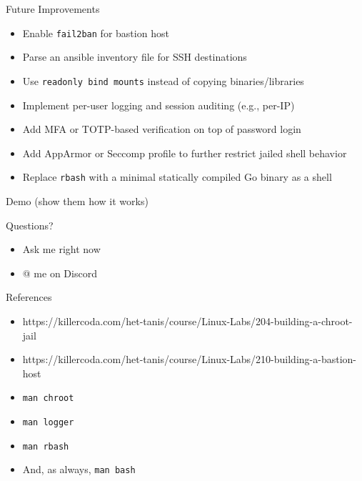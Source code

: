 \documentclass[14pt,compress,dvipsnames,aspectratio=169]{beamer} %
\begin{document}
\begin{frame}{Future Improvements}
    \begin{itemize}
        \item{Enable \texttt{fail2ban} for bastion host} 
        \item{Parse an ansible inventory file for SSH destinations} 
        \item{Use \texttt{readonly bind mounts} instead of copying binaries/libraries}
        \item{Implement per-user logging and session auditing (e.g., per-IP)}
        \item{Add MFA or TOTP-based verification on top of password login}
        \item{Add AppArmor or Seccomp profile to further restrict jailed shell behavior}
        \item{Replace \texttt{rbash} with a minimal statically compiled Go binary as a shell}
    \end{itemize}
\end{frame}

\begin{frame}{Demo}
    (show them how it works)
\end{frame}

\begin{frame}{Questions?}
    \begin{itemize}
        \vspace{1.0cm}
        \item{Ask me right now}
        \vspace{1.0cm}
        \item{@ me on Discord} 
    \end{itemize}
\end{frame}



\begin{frame}{References}
    \begin{itemize}
        \item{https://killercoda.com/het-tanis/course/Linux-Labs/204-building-a-chroot-jail}
        \item{https://killercoda.com/het-tanis/course/Linux-Labs/210-building-a-bastion-host}
        \item{\texttt{man chroot}}
        \item{\texttt{man logger}}
        \item{\texttt{man rbash}}
        \item{And, as always, \texttt{man bash}}
    \end{itemize}
\end{frame}
\end{document}
